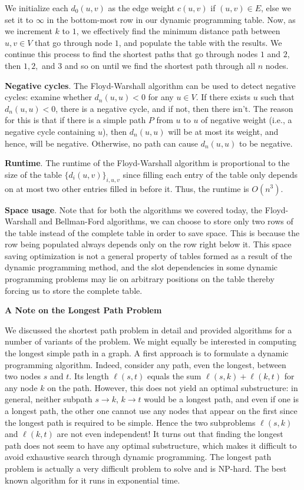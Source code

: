 \documentclass [12pt]{article}
\theoremstyle{definition}
\begin{document}
We initialize each $d_0(u, v )$ as the edge weight $c(u, v )$ if $(u, v ) \in E$, else we set it to $\infty$ in the bottom-most row in our dynamic programming table. Now, as we increment $k$ to $1$, we effectively find the minimum distance path between $u, v \in V$ that go through node $1$, and populate the table with the results. We continue this process to find the shortest paths that go through nodes $1$ and $2$, then $1, 2,$ and $3$ and so on until we find the shortest path through all $n$ nodes. 

\textbf{Negative cycles}. The Floyd-Warshall algorithm can be used to detect negative cycles: examine whether $d_n(u, u) < 0$ for any $u \in V$. If there exists $u$ such that $d_n(u, u) < 0$, there is a negative cycle, and if not, then there isn't. The reason for this is that if there is a simple path $P$ from $u$ to $u$ of negative weight (i.e., a negative cycle containing $u$), then $d_n(u, u)$ will be at most its weight, and hence, will be negative. Otherwise, no path can cause $d_n(u, u)$ to be negative. 

\textbf{Runtime}. The runtime of the Floyd-Warshall algorithm is proportional to the size of the table $\{d_i (u, v )\}_{i,u,v}$ since filling each entry of the table only depends on at most two other entries filled in before it. Thus, the runtime is $O(n^3)$. 

\textbf{Space usage}. Note that for both the algorithms we covered today, the Floyd-Warshall and Bellman-Ford algorithms, we can choose to store only two rows of the table instead of the complete table in order to save space. This is because the row being populated always depends only on the row right below it. This space saving optimization is not a general property of tables formed as a result of the dynamic programming method, and the slot dependencies in some dynamic programming problems may lie on arbitrary positions on the table thereby forcing us to store the complete table.


\textbf{A Note on the Longest Path Problem}

We discussed the shortest path problem in detail and provided algorithms for a number of variants of the problem. We might equally be interested in computing the longest simple path in a graph. A first approach is to formulate a dynamic programming algorithm. Indeed, consider any path, even the longest, between two nodes $s$ and $t$. Its length $\ell(s, t)$ equals the sum $\ell(s, k) + \ell(k, t)$ for any node $k$ on the path. However, this does not yield an optimal substructure: in general, neither subpath $s \to k$, $k \to t$ would be a longest path, and even if one is a longest path, the other one cannot use any nodes that appear on the first since the longest path is required to be simple. Hence the two subproblems $\ell(s, k)$ and $\ell(k, t)$ are not even independent! It turns out that finding the longest path does not seem to have any optimal substructure, which makes it difficult to avoid exhaustive search through dynamic programming. The longest path problem is actually a very difficult problem to solve and is NP-hard. The best known algorithm for it runs in exponential time.
\end{document}
